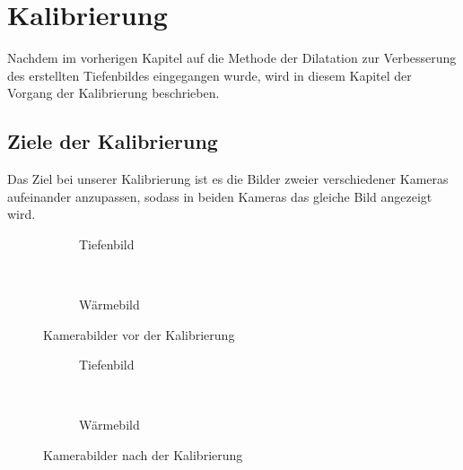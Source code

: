 
\chapter{Kalibrierung}
\label{chap:calibration}

Nachdem im vorherigen Kapitel auf die Methode der Dilatation zur Verbesserung des erstellten Tiefenbildes eingegangen wurde, wird in diesem Kapitel der Vorgang der Kalibrierung beschrieben.

\section{Ziele der Kalibrierung}
Das Ziel bei unserer Kalibrierung ist es die Bilder zweier verschiedener Kameras aufeinander anzupassen, sodass in beiden Kameras das gleiche Bild angezeigt wird.

\begin{figure}[h]
	\centering
	\begin{subfigure}[t]{0.45\textwidth}
		\centering
		\caption{Tiefenbild}
		\label{fig:calib_pre_deepth}
	\end{subfigure}
	~
	\begin{subfigure}[t]{0.45\textwidth}
		\centering
		\caption{Wärmebild}
		\label{fig:calib_pre_heat}
	\end{subfigure}
	\caption{Kamerabilder vor der Kalibrierung}
	\label{fig:calib_pre}
\end{figure}

\begin{figure}[h]
	\centering
	\begin{subfigure}[t]{0.45\textwidth}
		\centering
		\caption{Tiefenbild}
		\label{fig:calib_post_deepth}
	\end{subfigure}
	~
	\begin{subfigure}[t]{0.45\textwidth}
		\centering
		\caption{Wärmebild}
		\label{fig:calib_post_heat}
	\end{subfigure}
	\caption{Kamerabilder nach der Kalibrierung}
	\label{fig:calib_ost}
\end{figure}

